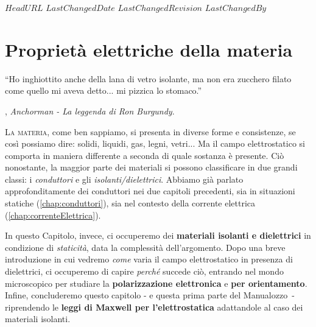\svnidlong
{$HeadURL$}
{$LastChangedDate$}
{$LastChangedRevision$}
{$LastChangedBy$}

\chapter{Proprietà elettriche della materia}

\begin{introduction}
	``Ho inghiottito anche della lana di vetro isolante, ma non era zucchero filato come quello mi aveva detto... mi pizzica lo stomaco.''
	\begin{flushright}
		, \emph{Anchorman - La leggenda di Ron Burgundy}. 
	\end{flushright}
\end{introduction}
\lettrine[findent=1pt, nindent=0pt]{L}{a materia}, come ben sappiamo, si presenta in diverse forme e consistenze, se così possiamo dire: solidi, liquidi, gas, legni, vetri... Ma il campo elettrostatico si comporta in maniera differente a seconda di quale sostanza è presente. Ciò nonostante, la maggior parte dei materiali si possono classificare in due grandi classi: i \textit{conduttori} e gli \textit{isolanti/dielettrici}. Abbiamo già parlato approfonditamente dei conduttori nei due capitoli precedenti, sia in situazioni statiche (\autoref{chap:conduttori}), sia nel contesto della corrente elettrica (\autoref{chap:correnteElettrica}). 

In questo Capitolo, invece, ci occuperemo dei \textbf{materiali isolanti e dielettrici} in condizione di \textit{staticità}, data la complessità dell'argomento. Dopo una breve introduzione in cui vedremo \textit{come} varia il campo elettrostatico in presenza di dielettrici, ci occuperemo di capire \textit{perché} succede ciò, entrando nel mondo microscopico per studiare la \textbf{polarizzazione elettronica} e \textbf{per orientamento}. Infine, concluderemo questo capitolo - e questa prima parte del Manualozzo\texttrademark\ - riprendendo le \textbf{leggi di Maxwell per l'elettrostatica} adattandole al caso dei materiali isolanti.
